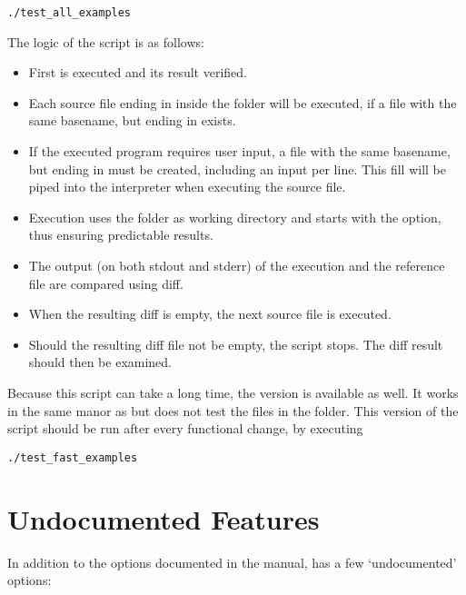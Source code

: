 \begin{lstlisting}[frame=none,numbers=none]
./test_all_examples
\end{lstlisting}

The logic of the script is as follows:
\begin{itemize}
	\item First  is executed and its result verified.
	\item Each source file ending in  inside the  folder will be executed, if a file with the same basename, but ending in  exists.
	\item If the executed program requires user input, a file with the same basename, but ending in  must be created, including an input per line. This fill will be piped into the interpreter when executing the source file.
	\item Execution uses the  folder as working directory and starts \setlX{} with the  option, thus ensuring predictable results. 
	\item The output (on both stdout and stderr) of the execution and the reference file are compared using diff.
	\item When the resulting diff is empty, the next source file is executed.
	\item Should the resulting diff file not be empty, the script stops. The diff result should then be examined.
\end{itemize}

Because this script can take a long time, the  version is available as well.
It works in the same manor as  but does not test the files in the  folder.
This version of the script should be run after every functional change, by executing

\begin{lstlisting}[frame=none,numbers=none]
./test_fast_examples
\end{lstlisting}

\section{Undocumented Features}

In addition to the options documented in the manual, \setlX{} has a few `undocumented' options:

